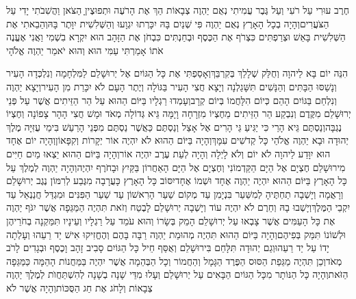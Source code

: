 \documentclass[../main/main.tex]{subfiles}
\begin{document}
\begin{multicols*}{\ncols}
חֶרֶב עוּרִי עַל רֹעִי וְעַל גֶּבֶר עֲמִיתִי נְאֻם יַהְוֶה צְבָאוֹת הַךְ אֶת הָרֹעֶה וּתְפוּצֶיןָ הַצֹּאן וַהֲשִׁבֹתִי יָדִי עַל הַצֹּעֲרִים\PreVerseSpace{}וְהָיָה בְכָל הָאָרֶץ נְאֻם יַהְוֶה פִּי שְׁנַיִם בָּהּ יִכָּרְתוּ יִגְוָעוּ וְהַשְּׁלִשִׁית יִוָּתֶר בָּהּ\PreVerseSpace{}וְהֵבֵאתִי אֶת הַשְּׁלִשִׁית בָּאֵשׁ וּצְרַפְתִּים כִּצְרֹף אֶת הַכֶּסֶף וּבְחַנְתִּים כִּבְחֹן אֶת הַזָּהָב הוּא יִקְרָא בִשְׁמִי וַאֲנִי אֶעֱנֶה אֹתוֹ אָמַרְתִּי עַמִּי הוּא וְהוּא יֹאמַר יַהְוֶה אֱלֹהָי\OpenSection{}\par
{}הִנֵּה יוֹם בָּא לַיהוָה וְחֻלַּק שְׁלָלֵךְ בְּקִרְבֵּךְ\PreVerseSpace{}וְאָסַפְתִּי אֶת כָּל הַגּוֹיִם אֶל יְרוּשָׁלֵם לַמִּלְחָמָה וְנִלְכְּדָה הָעִיר וְנָשַׁסּוּ הַבָּתִּים וְהַנָּשִׁים תִּשָּׁגַלְנָה וְיָצָא חֲצִי הָעִיר בַּגּוֹלָה וְיֶתֶר הָעָם לֹא יִכָּרֵת מִן הָעִיר\PreVerseSpace{}וְיָצָא יַהְוֶה וְנִלְחַם בַּגּוֹיִם הָהֵם כְּיוֹם הִלָּחֲמוֹ בְּיוֹם קְרָב\PreVerseSpace{}וְעָמְדוּ רַגְלָיו בַּיּוֹם הַהוּא עַל הַר הַזֵּיתִים אֲשֶׁר עַל פְּנֵי יְרוּשָׁלֵם מִקֶּדֶם וְנִבְקַע הַר הַזֵּיתִים מֵחֶצְיוֹ מִזְרָחָה וָיָמָּה גֵּיא גְּדוֹלָה מְאֹד וּמָשׁ חֲצִי הָהָר צָפוֹנָה וְחֶצְיוֹ נֶגְבָּה\PreVerseSpace{}וְנַסְתֶּם גֵּיא הָרַי כִּי יַגִּיעַ גֵּי הָרִים אֶל אָצַל וְנַסְתֶּם כַּאֲשֶׁר נַסְתֶּם מִפְּנֵי הָרַעַשׁ בִּימֵי עֻזִּיָּה מֶלֶךְ יְהוּדָה וּבָא יַהְוֶה אֱלֹהַי כָּל קְדֹשִׁים עִמָּךְ\PreVerseSpace{}וְהָיָה בַּיּוֹם הַהוּא לֹא יִהְיֶה אוֹר יְקָרוֹת וְקִפָּאוֹן\SubEnd{}\PreVerseSpace{}וְהָיָה יוֹם אֶחָד הוּא יִוָּדַע לַיהוָה לֹא יוֹם וְלֹא לָיְלָה וְהָיָה לְעֵת עֶרֶב יִהְיֶה אוֹר\PreVerseSpace{}וְהָיָה בַּיּוֹם הַהוּא יֵצְאוּ מַיִם חַיִּים מִירוּשָׁלֵם חֶצְיָם אֶל הַיָּם הַקַּדְמוֹנִי וְחֶצְיָם אֶל הַיָּם הָאַחֲרוֹן בַּקַּיִץ וּבָחֹרֶף יִהְיֶה\PreVerseSpace{}וְהָיָה יַהְוֶה לְמֶלֶךְ עַל כָּל הָאָרֶץ בַּיּוֹם הַהוּא יִהְיֶה יַהְוֶה אֶחָד וּשְׁמוֹ אֶחָד\PreVerseSpace{}יִסּוֹב כָּל הָאָרֶץ כָּעֲרָבָה מִגֶּבַע לְרִמּוֹן נֶגֶב יְרוּשָׁלֵם וְרָאֲמָה וְיָשְׁבָה תַחְתֶּיהָ לְמִשַּׁעַר בִּנְיָמִן עַד מְקוֹם שַׁעַר הָרִאשׁוֹן עַד שַׁעַר הַפִּנִּים וּמִגְדַּל חֲנַנְאֵל עַד יִקְבֵי הַמֶּלֶךְ\PreVerseSpace{}וְיָשְׁבוּ בָהּ וְחֵרֶם לֹא יִהְיֶה עוֹד וְיָשְׁבָה יְרוּשָׁלֵם לָבֶטַח \ClosedSection{}וְזֹאת תִּהְיֶה הַמַּגֵּפָה אֲשֶׁר יִגֹּף יַהְוֶה אֶת כָּל הָעַמִּים אֲשֶׁר צָבְאוּ עַל יְרוּשָׁלֵם הָמֵק בְּשָׂרוֹ וְהוּא עֹמֵד עַל רַגְלָיו וְעֵינָיו תִּמַּקְנָה בְחֹרֵיהֶן וּלְשׁוֹנוֹ תִּמַּק בְּפִיהֶם\PreVerseSpace{}וְהָיָה בַּיּוֹם הַהוּא תִּהְיֶה מְהוּמַת יַהְוֶה רַבָּה בָּהֶם וְהֶחֱזִיקוּ אִישׁ יַד רֵעֵהוּ וְעָלְתָה יָדוֹ עַל יַד רֵעֵהוּ\PreVerseSpace{}וְגַם יְהוּדָה תִּלָּחֵם בִּירוּשָׁלֵם וְאֻסַּף חֵיל כָּל הַגּוֹיִם סָבִיב זָהָב וָכֶסֶף וּבְגָדִים לָרֹב מְאֹד\PreVerseSpace{}וְכֵן תִּהְיֶה מַגֵּפַת הַסּוּס הַפֶּרֶד הַגָּמָל וְהַחֲמוֹר וְכָל הַבְּהֵמָה אֲשֶׁר יִהְיֶה בַּמַּחֲנוֹת הָהֵמָּה כַּמַּגֵּפָה הַזֹּאת\PreVerseSpace{}וְהָיָה כָּל הַנּוֹתָר מִכָּל הַגּוֹיִם הַבָּאִים עַל יְרוּשָׁלֵם וְעָלוּ מִדֵּי שָׁנָה בְשָׁנָה לְהִשְׁתַּחֲוֺת לְמֶלֶךְ יַהְוֶה צְבָאוֹת וְלָחֹג אֶת חַג הַסֻּכּוֹת\PreVerseSpace{}וְהָיָה אֲשֶׁר לֹא 
\end{multicols*}
\end{document}
